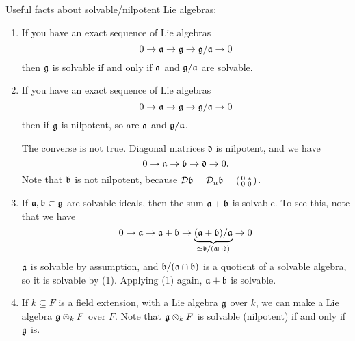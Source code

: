 \noindent Useful facts about solvable/nilpotent Lie algebras:
 \begin{enumerate}
 \item \label{lec11Fexactsolv} If you have an exact sequence of Lie algebras
 \[
    0\to \mathfrak{a}\to \mathfrak{g}\to \mathfrak{g}/\mathfrak{a} \to 0
 \]
 then $\mathfrak{g}$ is solvable if and only if $\mathfrak{a}$ and $\mathfrak{g}/\mathfrak{a}$ are solvable.

 \item \label{lec11Fexactnil} If you have an exact sequence of Lie algebras
 \[
    0\to \mathfrak{a}\to \mathfrak{g}\to \mathfrak{g}/\mathfrak{a} \to 0
 \]
 then if $\mathfrak{g}$ is nilpotent, so are $\mathfrak{a}$ and $\mathfrak{g}/\mathfrak{a}$.

 \begin{warning}
   The converse is not true. Diagonal matrices $\mathfrak{d}$ is
   nilpotent, and we have
 \[
    0\to \mathfrak{n}\to \mathfrak{b}\to \mathfrak{d}\to 0.
 \]
 Note that $\mathfrak{b}$ is not nilpotent, because $\mathcal{D}\mathfrak{b}=\mathcal{D}_n\mathfrak{b}=\left( \begin{smallmatrix} 0 & \ast \\ 0 & 0 \end{smallmatrix} \right)$.
 \end{warning}

 \item \label{lec11Fsumsolv} If $\mathfrak{a},\mathfrak{b}\subset \mathfrak{g}$ are solvable ideals, then the sum
 $\mathfrak{a}+\mathfrak{b}$ is solvable. To see this, note that we have
 \[
    0\to \mathfrak{a}\to \mathfrak{a}+\mathfrak{b} \to \underbrace{(\mathfrak{a}+\mathfrak{b})/\mathfrak{a}}_{\simeq \mathfrak{b}/(\mathfrak{a}\cap\mathfrak{b})} \to 0
 \]
 $\mathfrak{a}$ is solvable by assumption, and $\mathfrak{b}/(\mathfrak{a}\cap\mathfrak{b})$ is a quotient of a solvable
 algebra, so it is solvable by (1). Applying (1) again, $\mathfrak{a}+\mathfrak{b}$ is solvable.


 \item \label{lec11Fscalers} If $k\subseteq F$ is a field extension, with a Lie algebra
 $\mathfrak{g}$ over $k$, we can make a Lie algebra $\mathfrak{g}\otimes_k F$ over $F$. Note that
 $\mathfrak{g}\otimes_k F$ is solvable (nilpotent) if and only if $\mathfrak{g}$ is.
 \end{enumerate}


